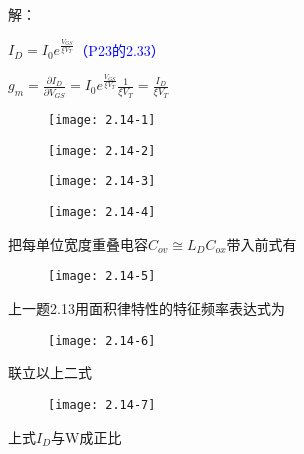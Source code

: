






解：

\scalebox{3}{（1）}

$I_D=I_0e^{\frac{V_{GS}}{\xi V_T}}$\textcolor{blue}{（P23的2.33）}

$g_m=\frac{\partial I_D}{\partial V_{GS}}=I_0e^{\frac{V_{GS}}{\xi V_T}}\frac{1}{\xi V_T}=\frac{I_D}{\xi V_T}$


\begin{figure}[H] %
	\begin{minipage}{\linewidth}
		\texttt{[image: 2.14-1]}
	\end{minipage}
\end{figure}


\begin{figure}[H] %
	\begin{minipage}{\linewidth}
		\texttt{[image: 2.14-2]}
	\end{minipage}
\end{figure}


\begin{figure}[H] %
	\begin{minipage}{\linewidth}
		\texttt{[image: 2.14-3]}
	\end{minipage}
\end{figure}


\begin{figure}[H] %
	\begin{minipage}{\linewidth}
		\texttt{[image: 2.14-4]}
	\end{minipage}
\end{figure}

\scalebox{3}{（2）}

把每单位宽度重叠电容$C_{ov}\cong L_DC_{ox}$带入前式有

\begin{figure}[H] %
	\begin{minipage}{\linewidth}
		\texttt{[image: 2.14-5]}
	\end{minipage}
\end{figure}

上一题2.13用面积律特性的特征频率表达式为

\begin{figure}[H] %
	\begin{minipage}{\linewidth}
		\texttt{[image: 2.14-6]}
	\end{minipage}
\end{figure}

联立以上二式

\begin{figure}[H] %
	\begin{minipage}{\linewidth}
		\texttt{[image: 2.14-7]}
	\end{minipage}
\end{figure}



上式$I_D$与W成正比